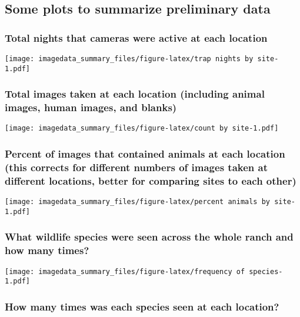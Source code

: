 \documentclass[
]{article}
\begin{document}
\subsection{Some plots to summarize preliminary
data}\label{some-plots-to-summarize-preliminary-data}

\subsubsection{Total nights that cameras were active at each
location}\label{total-nights-that-cameras-were-active-at-each-location}

\texttt{[image: imagedata\_summary\_files/figure-latex/trap nights by site-1.pdf]}

\subsubsection{Total images taken at each location (including animal
images, human images, and
blanks)}\label{total-images-taken-at-each-location-including-animal-images-human-images-and-blanks}

\texttt{[image: imagedata\_summary\_files/figure-latex/count by site-1.pdf]}

\subsubsection{Percent of images that contained animals at each location
(this corrects for different numbers of images taken at different
locations, better for comparing sites to each
other)}\label{percent-of-images-that-contained-animals-at-each-location-this-corrects-for-different-numbers-of-images-taken-at-different-locations-better-for-comparing-sites-to-each-other}

\texttt{[image: imagedata\_summary\_files/figure-latex/percent animals by site-1.pdf]}

\subsubsection{What wildlife species were seen across the whole ranch
and how many
times?}\label{what-wildlife-species-were-seen-across-the-whole-ranch-and-how-many-times}

\texttt{[image: imagedata\_summary\_files/figure-latex/frequency of species-1.pdf]}

\subsubsection{How many times was each species seen at each
location?}\label{how-many-times-was-each-species-seen-at-each-location}
\end{document}
